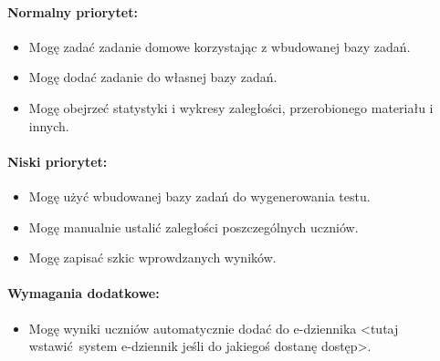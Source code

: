 \documentclass[polish,12pt]{aghthesis}
\begin{document}
\paragraph{Normalny priorytet:}
\begin{itemize}
	\item{Mogę zadać zadanie domowe korzystając z wbudowanej bazy zadań.}
	\item{Mogę dodać zadanie do własnej bazy zadań.}
	\item{Mogę obejrzeć statystyki i wykresy zaległości, przerobionego materiału i innych.} 
\end{itemize}

\paragraph{Niski priorytet:}
\begin{itemize}
	\item{Mogę użyć wbudowanej bazy zadań do wygenerowania testu.}
	\item{Mogę manualnie ustalić zaległości poszczególnych uczniów.}
	\item{Mogę zapisać szkic wprowdzanych wyników.}
\end{itemize}

\paragraph{Wymagania dodatkowe:}
\begin{itemize}
	\item{Mogę wyniki uczniów automatycznie dodać do e-dziennika <tutaj wstawić system e-dziennik jeśli do jakiegoś dostanę dostęp>.}
\end{itemize}


\section{\SectionTitleRealizationAspects}
\label{sec:wybrane-aspekty-realizacji}

\section{\SectionTitleWorkOrganization}
\label{sec:organizacja-pracy}
\end{document}
